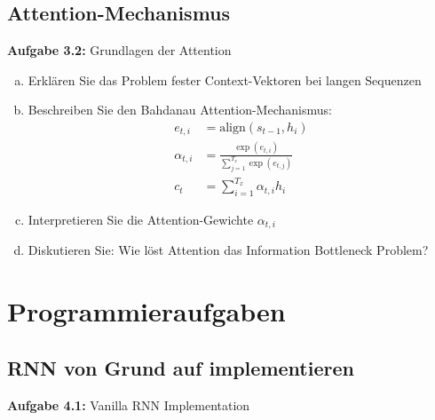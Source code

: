 \documentclass[12pt,a4paper]{article}
\begin{document}
\subsection{Attention-Mechanismus}

\textbf{Aufgabe 3.2:} Grundlagen der Attention

\begin{enumerate}[(a)]
    \item Erklären Sie das Problem fester Context-Vektoren bei langen Sequenzen
    \item Beschreiben Sie den Bahdanau Attention-Mechanismus:
    \begin{align}
    e_{t,i} &= \text{align}(s_{t-1}, h_i) \\
    \alpha_{t,i} &= \frac{\exp(e_{t,i})}{\sum_{j=1}^{T_x} \exp(e_{t,j})} \\
    c_t &= \sum_{i=1}^{T_x} \alpha_{t,i} h_i
    \end{align}
    \item Interpretieren Sie die Attention-Gewichte $\alpha_{t,i}$
    \item Diskutieren Sie: Wie löst Attention das Information Bottleneck Problem?
\end{enumerate}

\section{Programmieraufgaben}

\subsection{RNN von Grund auf implementieren}

\textbf{Aufgabe 4.1:} Vanilla RNN Implementation
\end{document}
